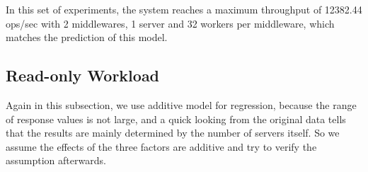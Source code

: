 In this set of experiments, the system reaches a maximum throughput of 12382.44 ops/sec with 2 middlewares, 1 server and 32 workers per middleware, which matches the prediction of this model.

\subsection{Read-only Workload}

Again in this subsection, we use additive model for regression, because the range of response values is not large, and a quick looking from the original data tells that the results are mainly determined by the number of servers itself. So we assume the effects of the three factors are additive and try to verify the assumption afterwards.

